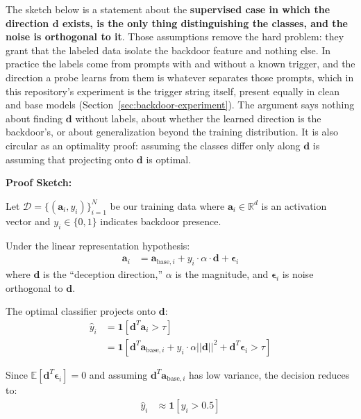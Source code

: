 \documentclass[11pt,letterpaper]{article}
\newcommand{\ind}{\mathbf{1}}
\begin{document}
\begin{warningbox}
The sketch below is a statement about the \textbf{supervised case in which the direction $\mathbf{d}$ exists, is the only thing distinguishing the classes, and the noise is orthogonal to it}. Those assumptions remove the hard problem: they grant that the labeled data isolate the backdoor feature and nothing else. In practice the labels come from prompts with and without a known trigger, and the direction a probe learns from them is whatever separates those prompts, which in this repository's experiment is the trigger string itself, present equally in clean and base models (Section~\ref{sec:backdoor-experiment}). The argument says nothing about finding $\mathbf{d}$ without labels, about whether the learned direction is the backdoor's, or about generalization beyond the training distribution. It is also circular as an optimality proof: assuming the classes differ only along $\mathbf{d}$ is assuming that projecting onto $\mathbf{d}$ is optimal.
\end{warningbox}

\textbf{Proof Sketch:}

Let $\mathcal{D} = \{(\mathbf{a}_i, y_i)\}_{i=1}^N$ be our training data where $\mathbf{a}_i \in \mathbb{R}^d$ is an activation vector and $y_i \in \{0, 1\}$ indicates backdoor presence.

Under the linear representation hypothesis:
\begin{align}
\mathbf{a}_i &= \mathbf{a}_{\text{base},i} + y_i \cdot \alpha \cdot \mathbf{d} + \boldsymbol{\epsilon}_i
\end{align}
where $\mathbf{d}$ is the ``deception direction,'' $\alpha$ is the magnitude, and $\boldsymbol{\epsilon}_i$ is noise orthogonal to $\mathbf{d}$.

The optimal classifier projects onto $\mathbf{d}$:
\begin{align}
\hat{y}_i &= \ind[\mathbf{d}^T \mathbf{a}_i > \tau] \\
&= \ind[\mathbf{d}^T \mathbf{a}_{\text{base},i} + y_i \cdot \alpha ||\mathbf{d}||^2 + \mathbf{d}^T \boldsymbol{\epsilon}_i > \tau]
\end{align}

Since $\mathbb{E}[\mathbf{d}^T \boldsymbol{\epsilon}_i] = 0$ and assuming $\mathbf{d}^T \mathbf{a}_{\text{base},i}$ has low variance, the decision reduces to:
\begin{align}
\hat{y}_i &\approx \ind[y_i > 0.5]
\end{align}
\end{document}
